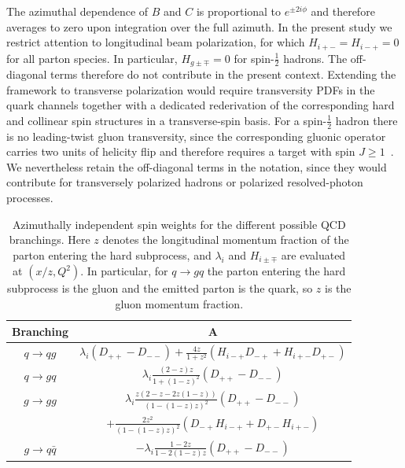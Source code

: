 \documentclass[a4paper,11pt]{article}
\begin{document}
The azimuthal dependence of $B$ and $C$ is proportional to $e^{\pm 2 i\phi}$ and therefore averages to zero upon integration over the full azimuth.
In the present study we restrict attention to longitudinal beam polarization, for which $H_{i+-}=H_{i-+}=0$ for all parton species. In particular, $H_{g\pm\mp}=0$ for spin-$\frac12$ hadrons. The off-diagonal terms therefore do not contribute in the present context. Extending the framework to transverse polarization would require transversity PDFs in the quark channels together with a dedicated rederivation of the corresponding hard and collinear spin structures in a transverse-spin basis. For a spin-$\frac12$ hadron there is no leading-twist gluon transversity, since the corresponding gluonic operator carries two units of helicity flip and therefore requires a target with spin $J\ge 1$~\cite{Jaffe:1989xy,Kumano:2019igu}. We nevertheless retain the off-diagonal terms in the notation, since they would contribute for transversely polarized hadrons or polarized resolved-photon processes.
\begin{table}
  \begin{center}
    \begin{tabular}{|c|c|}
      \hline
      Branching & A \\
      \hline
      $q\to qg$ & $\lambda_i \left(D_{++}-D_{--}\right)+\frac{4 z}{1+z^2} \left(H_{i-+}D_{-+} +H_{i+-}D_{+-} \right)$ \\
      \hline
      $q\to gq$ & $\lambda_i \frac{  (2-z) z}{1+(1-z)^2} \left(D_{++}-D_{--}\right)$ \\
      \hline
      $g\to gg$ & $\lambda_i \frac{z (2-z -2z(1-z))}{(1-(1-z) z)^2} \left(D_{++}-D_{--}\right)$ \\
      & $+\frac{2 z^2}{(1-(1-z)z)^2}\left(D_{-+} H_{i-+}+D_{+-}H_{i+-}\right)$\\
      \hline
      $g\to q\bar{q}$ & $-\lambda_i \frac{1-2 z}{1-2 (1-z) z}\left(D_{++}-D_{--}\right)$ \\
      \hline
  \end{tabular}
    \caption{Azimuthally independent spin weights for the different possible QCD branchings. Here $z$ denotes the longitudinal momentum fraction of the parton entering the hard subprocess, and $\lambda_i$ and $H_{i\pm\mp}$ are evaluated at $(x/z,Q^2)$. In particular, for $q\to gq$ the parton entering the hard subprocess is the gluon and the emitted parton is the quark, so $z$ is the gluon momentum fraction.}
    \label{tab:branch1}
  \end{center}
\end{table}
\end{document}

